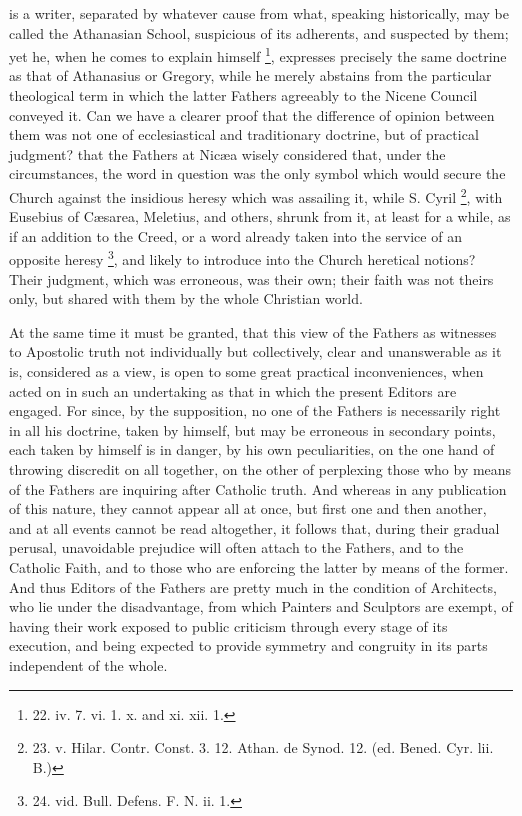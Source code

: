 is a writer, separated by whatever cause from what, speaking
historically, may be called the Athanasian School, suspicious of its
adherents, and suspected by them; yet he, when he comes to explain
himself \footnote{22. iv.
7. vi. 1. x. and xi. xii. 1.}, expresses
precisely the same doctrine as that of Athanasius or Gregory, while he
merely abstains from the particular theological term in which the
latter Fathers agreeably to the Nicene Council conveyed it. Can we
have a clearer proof that the difference of opinion between them was
not one of ecclesiastical and traditionary doctrine, but of practical
judgment? that the Fathers at Nicæa wisely considered that, under the
circumstances, the word in question was the only symbol which would
secure the Church against the insidious heresy which was assailing it,
while S. Cyril \footnote{23. v.
Hilar. Contr. Const. 3. 12. Athan. de Synod. 12. (ed. Bened. Cyr. lii.
B.)}, with
Eusebius of Cæsarea, Meletius, and others, shrunk from it, at least
for a while, as if an addition to the Creed, or a word already taken
into the service of an opposite heresy \footnote{24. vid.
Bull. Defens. F. N. ii. 1.}, and likely to introduce into the Church heretical notions?
Their judgment, which was erroneous, was their own; their faith was
not theirs only, but shared with them by the whole Christian world.

At the same time it must be
granted, that this view of the Fathers as witnesses to Apostolic truth
not individually but collectively, clear and unanswerable as it is,
considered as a view, is open to some great practical inconveniences,
when acted on in such an undertaking as that in which the present
Editors are engaged. For since, by the supposition, no one of the
Fathers is necessarily right in all his doctrine, taken by himself,
but may be erroneous in secondary points, each taken by himself is in
danger, by his own peculiarities, on the one hand of throwing
discredit on all together, on the other of perplexing those who by
means of the Fathers are inquiring after Catholic truth. And whereas
in any publication of this nature, they cannot appear all at once, but
first one and then another, and at all events cannot be read
altogether, it follows that, during their gradual perusal, unavoidable
prejudice will often attach to the Fathers, and to the Catholic Faith,
and to those who are enforcing the latter by means of the former. And
thus Editors of the Fathers are pretty much in the condition of
Architects, who lie under the disadvantage, from which Painters and
Sculptors are exempt, of having their work exposed to public criticism
through every stage of its execution, and being expected to provide
symmetry and congruity in its parts independent of the whole.

